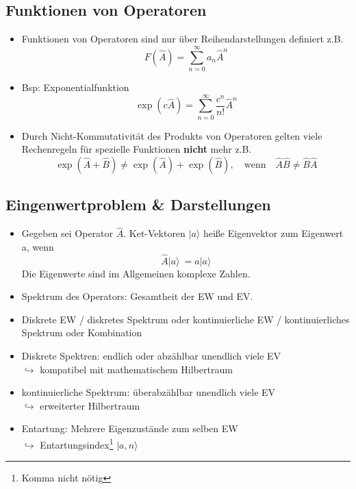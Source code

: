 \documentclass[10pt,article,colorback,accentcolor=tud9d]{scrartcl}
\begin{document}
\subsection{Funktionen von Operatoren}
\begin{itemize}
  \item Funktionen von Operatoren sind nur über Reihendarstellungen definiert z.B.
    \begin{equation}
    F(\hat{A})=\sum^\infty_{n=0}a_n\hat{A}^n
    \end{equation}
  \item Bsp: Exponentialfunktion
    \begin{equation}
    \exp(c\hat{A})= \sum^\infty_{n=0}\frac{c^n}{n!}\hat{A}^n
    \end{equation}
  \item Durch Nicht-Kommutativität des Produkts von Operatoren gelten viele Rechenregeln für spezielle Funktionen \textbf{nicht} mehr z.B.
  \begin{equation}
  \exp(\hat{A}+\hat{B})\neq \exp(\hat{A}) +\exp(\hat{B}), \quad \text{wenn} \quad \hat{A}\hat{B} \neq \hat{B}\hat{A}
  \end{equation}
\end{itemize}
\subsection{Eingenwertproblem \& Darstellungen}
\begin{itemize}
  \item Gegeben sei Operator $\hat{A}$. Ket-Vektoren $|a\rangle $ heiße Eigenvektor zum Eigenwert a, wenn
    \begin{equation}
    \hat{A}|a\rangle  \ = a|a\rangle 
    \end{equation}
    Die Eigenwerte sind im Allgemeinen komplexe Zahlen.
  \item Spektrum des Operators: Gesamtheit der EW und EV.
  \item Diskrete EW / diskretes Spektrum oder kontinuierliche EW / kontinuierliches Spektrum oder Kombination
  \item Diskrete Spektren: endlich oder abzählbar unendlich viele EV\\
    $\hookrightarrow$ kompatibel mit mathematischem Hilbertraum
  \item kontinuierliche Spektrum: überabzählbar unendlich viele EV\\
    $\hookrightarrow$ erweiterter Hilbertraum
  \item Entartung: Mehrere Eigenzustände zum selben EW\\
    $\hookrightarrow$ Entartungsindex\footnote{Komma nicht nötig} $|a,n\rangle $
\end{itemize}
\end{document}
